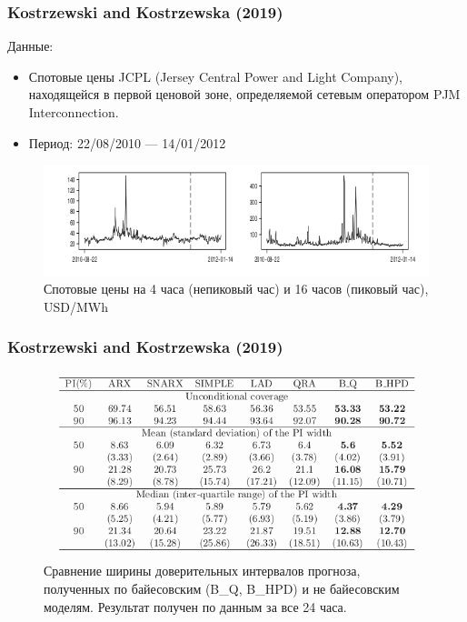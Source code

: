 \documentclass[c, dvipsnames]{beamer}  %
\begin{document}
\begin{frame}[shrink=5]
\frametitle{Kostrzewski and Kostrzewska (2019)} 

Данные: 
\begin{itemize}
	\item Спотовые цены JCPL (Jersey Central Power and Light Company), находящейся   в первой  ценовой зоне, определяемой сетевым оператором PJM Interconnection.
	\item Период: 22/08/2010 ---  14/01/2012
\end{itemize}

\begin{figure}
\centering
\includegraphics[width=1\linewidth]{screenshot012}
\caption{Спотовые цены на 4 часа (непиковый час) и 16 часов (пиковый час), USD/MWh }
\label{fig:screenshot006}
\end{figure}

\end{frame}





\begin{frame}[shrink=5]
\frametitle{Kostrzewski and Kostrzewska (2019)} 
\begin{figure}
\centering
\includegraphics[width=0.9\linewidth]{screenshot006}
\caption{Сравнение ширины доверительных интервалов прогноза, полученных по байесовским (B\_Q, B\_HPD) и не байесовским моделям. Результат получен по данным за все 24 часа.}
\label{fig:screenshot006}
\end{figure}
\end{frame}
\end{document}
